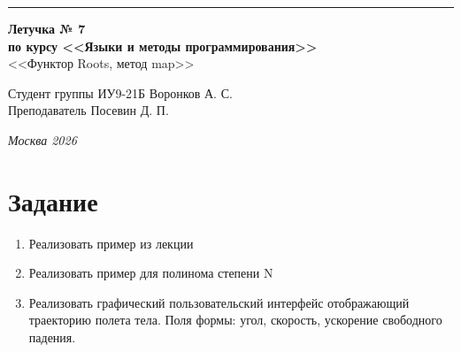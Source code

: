 \documentclass[a4paper, 14pt]{extarticle}
\begin{document}
\begin{titlepage}
\vspace*{-16pt}
\hspace{30pt}\rule{0.866\textwidth}{0.4pt}
  
\vspace{11em}

\begin{center}
\Large {\bf Летучка № 7} \\ 
\large {\bf по курсу <<Языки и методы программирования>>} \\ 
\large <<Функтор Roots, метод map>>
\end{center}\normalsize

\vspace{8em}


\begin{flushright}
  {Студент группы ИУ9-21Б Воронков А. С.\hspace*{15pt} \\
  \vspace{2ex}
  Преподаватель Посевин Д. П.\hspace*{15pt}}
\end{flushright}

\bigskip

\vfill
 

\begin{center}
\textsl{Москва 2026}
\end{center}
\end{titlepage}

\renewcommand{\ttdefault}{pcr}

\setlength{\tabcolsep}{3pt}
\newpage
\setcounter{page}{2}

\section{Задание}
\begin{enumerate}
    \item Реализовать пример из лекции
    \item Реализовать пример для полинома степени N
    \item Реализовать графический пользовательский интерфейс отображающий траекторию полета тела. Поля формы: угол, скорость, ускорение свободного падения.
\end{enumerate}
\end{document}

